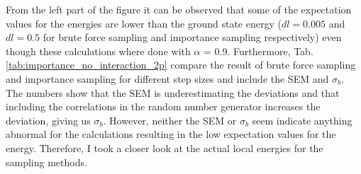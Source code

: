 From the left part of the figure it can be observed that some of the expectation values for the energies are lower than the ground state energy ($dl = 0.005$ and $dl = 0.5$ for brute force sampling and importance sampling respectively) even though these calculations where done with $\alpha$ = 0.9. Furthermore, Tab. \ref{tab:importance_no_interaction_2p} compare the result of brute force sampling and importance sampling for different step sizes and include the SEM and $\sigma_b$. The numbers show that the SEM is underestimating the deviations and that including the correlations in the random number generator increases the deviation, giving us $\sigma_b$. However, neither the SEM or $\sigma_b$ seem indicate anything abnormal for the calculations resulting in the low expectation values for the energy. Therefore, I took a closer look at the actual local energies for the sampling methods.

